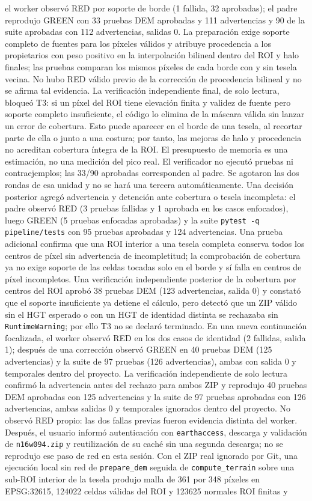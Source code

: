 \documentclass[11pt,a4paper]{article}
\begin{document}
el worker observó RED por soporte de borde (1 fallida, 32 aprobadas); el padre reprodujo GREEN con 33 pruebas DEM aprobadas y 111 advertencias y 90 de la suite aprobadas con 112 advertencias, salidas 0. La preparación exige soporte completo de fuentes para los píxeles válidos y atribuye procedencia a los propietarios con peso positivo en la interpolación bilineal dentro del ROI y halo finales; las pruebas comparan los mismos píxeles de cada borde con y sin tesela vecina. No hubo RED válido previo de la corrección de procedencia bilineal y no se afirma tal evidencia. La verificación independiente final, de solo lectura, bloqueó T3: si un píxel del ROI tiene elevación finita y validez de fuente pero soporte completo insuficiente, el código lo elimina de la máscara válida sin lanzar un error de cobertura. Esto puede aparecer en el borde de una tesela, al recortar parte de ella o junto a una costura; por tanto, las mejoras de halo y procedencia no acreditan cobertura íntegra de la ROI. El presupuesto de memoria es una estimación, no una medición del pico real. El verificador no ejecutó pruebas ni contraejemplos; las 33/90 aprobadas corresponden al padre. Se agotaron las dos rondas de esa unidad y no se hará una tercera automáticamente. Una decisión posterior agregó advertencia y detención ante cobertura o tesela incompleta: el padre observó RED (3 pruebas fallidas y 1 aprobada en los casos enfocados), luego GREEN (5 pruebas enfocadas aprobadas) y la suite \texttt{pytest -q pipeline/tests} con 95 pruebas aprobadas y 124 advertencias. Una prueba adicional confirma que una ROI interior a una tesela completa conserva todos los centros de píxel sin advertencia de incompletitud; la comprobación de cobertura ya no exige soporte de las celdas tocadas solo en el borde y sí falla en centros de píxel incompletos. Una verificación independiente posterior de la cobertura por centros del ROI aprobó 38 pruebas DEM (123 advertencias, salida 0) y constató que el soporte insuficiente ya detiene el cálculo, pero detectó que un ZIP válido sin el HGT esperado o con un HGT de identidad distinta se rechazaba sin \texttt{RuntimeWarning}; por ello T3 no se declaró terminado. En una nueva continuación focalizada, el worker observó RED en los dos casos de identidad (2 fallidas, salida 1); después de una corrección observó GREEN en 40 pruebas DEM (125 advertencias) y la suite de 97 pruebas (126 advertencias), ambas con salida 0 y temporales dentro del proyecto. La verificación independiente de solo lectura confirmó la advertencia antes del rechazo para ambos ZIP y reprodujo 40 pruebas DEM aprobadas con 125 advertencias y la suite de 97 pruebas aprobadas con 126 advertencias, ambas salidas 0 y temporales ignorados dentro del proyecto. No observó RED propio: las dos fallas previas fueron evidencia distinta del worker. Después, el usuario informó autenticación con \texttt{earthaccess}, descarga y validación de \texttt{n16w094.zip} y reutilización de su caché sin una segunda descarga; no se reprodujo ese paso de red en esta sesión. Con el ZIP real ignorado por Git, una ejecución local sin red de \texttt{prepare\_dem} seguida de \texttt{compute\_terrain} sobre una sub-ROI interior de la tesela produjo malla de 361 por 348 píxeles en EPSG:32615, 124022 celdas válidas del ROI y 123625 normales ROI finitas y 
\end{document}
